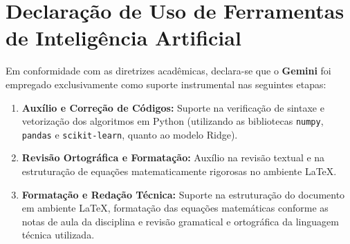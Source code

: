 \documentclass[12pt,a4paper]{article}
\begin{document}
\section{Declaração de Uso de Ferramentas de Inteligência Artificial}
Em conformidade com as diretrizes acadêmicas, declara-se que o \textbf{Gemini} foi empregado exclusivamente como suporte instrumental nas seguintes etapas:
\begin{enumerate}
    \item \textbf{Auxílio e Correção de Códigos:} Suporte na verificação de sintaxe e vetorização dos algoritmos em Python (utilizando as bibliotecas \texttt{numpy}, \texttt{pandas} e \texttt{scikit-learn}, quanto ao modelo Ridge).
    \item \textbf{Revisão Ortográfica e Formatação:} Auxílio na revisão textual e na estruturação de equações matematicamente rigorosas no ambiente \LaTeX.
    \item \textbf{Formatação e Redação Técnica:} Suporte na estruturação do documento em ambiente \LaTeX{}, formatação das equações matemáticas conforme as notas de aula da disciplina e revisão gramatical e ortográfica da linguagem técnica utilizada.
\end{enumerate}
\end{document}
